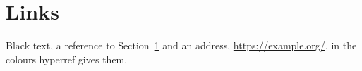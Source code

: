 \section{Links}\label{s:links}
Black text, a reference to Section~\ref{s:links} and an address,
\url{https://example.org/}, in the colours hyperref gives them.
